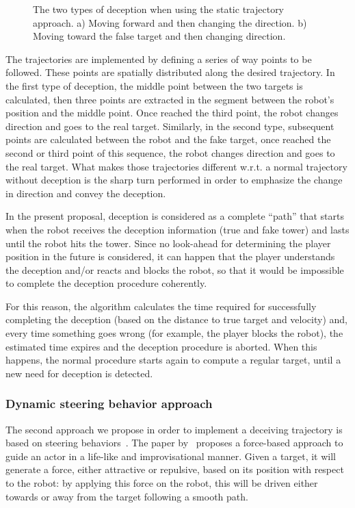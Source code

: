 \begin{figure}[h]
\begin{subfigure}[t]{0.45\columnwidth}
        \caption{}
        \label{fig:static_deception_2}
    \end{subfigure}
    \caption{The two types of deception when using the static trajectory approach. a) Moving forward and then changing the direction. b) Moving toward the false target and then changing direction.}
    \label{fig::trajectoryStatic}
\end{figure}

The trajectories are implemented by defining a series of way points to be followed. These points are spatially distributed along the desired trajectory. In the first type of deception, the middle point between the two targets is calculated, then three points are extracted in the segment between the robot's position and the middle point. Once reached the third point, the robot changes direction and goes to the real target. Similarly, in the second type, subsequent points are calculated between the robot and the fake target, once reached the second or third point of this sequence, the robot changes direction and goes to the real target. What makes those trajectories different w.r.t. a normal trajectory without deception is the sharp turn performed in order to emphasize the change in direction and convey the deception.

In the present proposal, deception is considered as a complete ``path'' that starts when the robot receives the deception information (true and fake tower) and lasts until the robot hits the tower. Since no look-ahead for determining the player position in the future is considered, it can happen that the player understands the deception and/or  reacts and blocks the robot, so that it would be impossible to complete the deception procedure coherently.

For this reason, the algorithm calculates the time required for successfully completing the deception (based on the distance to true target and velocity) and, every time something goes wrong (for example, the player blocks the robot), the estimated time expires and the deception procedure is aborted. When this happens, the normal procedure starts again to compute a regular target, until a new need for deception is detected.

\subsubsection{Dynamic steering behavior approach}
The second approach we propose in order to implement a deceiving trajectory is based on steering behaviors~\citep{reynolds_steering_1999}. The paper by~\cite{reynolds_steering_1999} proposes a force-based approach to guide an actor in a life-like and improvisational manner. Given a target, it will generate a force, either attractive or repulsive, based on its position with respect to the robot: by applying this force on the robot, this will be driven either towards or away from the target following a smooth path.

